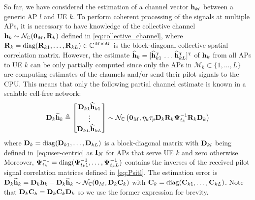 So far, we have considered the estimation of a channel vector $\mathbf{h}_{kl}$ between a generic AP $l$ and UE $k$. To perform coherent processing of the signals at multiple APs, it is necessary to have knowledge of the collective channel $\mathbf{h}_k \sim \mathcal{N}_{\mathbb{C}}(\mathbf{0}_M, \mathbf{R}_{k}) $ defined in \eqref{eq:collective_channel}, where $\mathbf{R}_{k} = \mathrm{diag}(\mathbf{R}_{k1}, \ldots,  \mathbf{R}_{kL}) \in \mathbb{C}^{M \times M}$
is the block-diagonal collective spatial correlation matrix. However, the estimate $\widehat{\vect{h}}_{k}  = [\widehat{\vect{h}}_{k1}^{\Ttran} \, \ldots \, \widehat{\vect{h}}_{kL}^{\Ttran}]^{\Ttran}$ of $\mathbf{h}_k$ from all APs to UE $k$ can be only partially computed since only the APs in $\mathcal{M}_k \subset\{1,\ldots,L\}$ are computing estimates of the channels and/or send their pilot signals to the CPU. This means that only the following partial channel estimate is known in a scalable cell-free network:
\begin{equation} \label{eq:estimates-central}
\mathbf{D}_{k}\widehat{\mathbf{h}}_{k} \triangleq \begin{bmatrix} \mathbf{D}_{k1}\widehat{\mathbf{h}}_{k1} \\ \vdots \\ \mathbf{D}_{kL}\widehat{\mathbf{h}}_{kL} 
\end{bmatrix} \sim \mathcal{N}_{\mathbb{C}} \left( \mathbf{0}_M, \eta_k \tau_p \mathbf{D}_{k}\mathbf{R}_{k} \mathbf{\Psi}_{t_k}^{-1} \mathbf{R}_{k}\mathbf{D}_{k} \right)
\end{equation}
where $\mathbf{D}_{k}  = \mathrm{diag}( \mathbf{D}_{k1} , \ldots, \mathbf{D}_{kL} )$ is a block-diagonal matrix with $\mathbf{D}_{kl}$ being defined in~\eqref{eq:user-centric} as $\mathbf{I}_N$ for APs that serve UE $k$ and zero otherwise.
Moreover,  $\mathbf{\Psi}_{t_k}^{-1} = \mathrm{diag}( \mathbf{\Psi}_{t_k1}^{-1}, \ldots, \mathbf{\Psi}_{t_kL}^{-1})$ contains the inverses of the received pilot signal correlation matrices defined in \eqref{eq:Psitl}.
 The estimation error is $\mathbf{D}_{k}\widetilde{\mathbf{h}}_k = \mathbf{D}_{k}\mathbf{h}_k - \mathbf{D}_{k}\widehat{\mathbf{h}}_{k} \sim \mathcal{N}_{\mathbb{C}}(\mathbf{0}_M,\mathbf{D}_{k}\mathbf{C}_k)$ with
$\mathbf{C}_k = \mathrm{diag}(\mathbf{C}_{k1}, \ldots, \mathbf{C}_{kL})$. Note that $\mathbf{D}_{k}\mathbf{C}_k = \mathbf{D}_{k}\mathbf{C}_k \mathbf{D}_k$ so we use the former expression for brevity.

